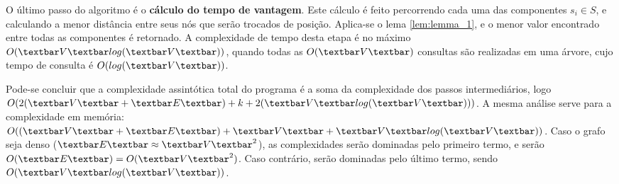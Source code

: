 O último passo do algoritmo é o \textbf{cálculo do tempo de vantagem}. Este cálculo é feito percorrendo cada uma das componentes $s_i \in S$, e calculando a menor distância entre seus nós que serão trocados de posição. Aplica-se o lema \ref{lem:lemma_1}, e o menor valor encontrado entre todas as componentes é retornado. A complexidade de tempo desta etapa é no máximo $O(\textbar V \textbar log(\textbar V \textbar ))$, quando todas as $O(\textbar V \textbar)$ consultas são realizadas em uma árvore, cujo tempo de consulta é $O(log(\textbar V \textbar ))$. 

Pode-se concluir que a complexidade assintótica total do programa é a soma da complexidade dos passos intermediários, logo $O(2(\textbar V \textbar + \textbar E \textbar) + k + 2(\textbar V \textbar log(\textbar V \textbar)) )$. A mesma análise serve para a complexidade em memória: $O( (\textbar V \textbar + \textbar E \textbar) + \textbar V \textbar + \textbar V \textbar log(\textbar V \textbar))$. Caso o grafo seja denso ($\textbar E \textbar \approx \textbar V \textbar^2$), as complexidades serão dominadas pelo primeiro termo, e serão $O(\textbar E \textbar) = O(\textbar V \textbar^2)$. Caso contrário, serão dominadas pelo último termo, sendo $O(\textbar V \textbar log(\textbar V \textbar))$.


